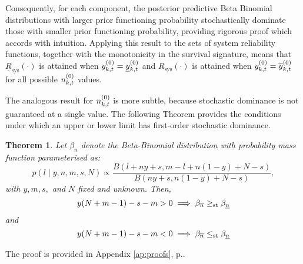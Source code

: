 \documentclass[12pt, a4paper]{elsarticle}
\newtheorem{theorem}{Theorem}
\newcommand{\ul}[1]{\underline{#1}}
\newcommand{\ol}[1]{\overline{#1}}
\newcommand{\lRsys}{\ul{R}_\text{sys}}
\newcommand{\uRsys}{\ol{R}_\text{sys}}
\begin{document}
Consequently, for each component, the posterior predictive Beta Binomial distributions 
with larger prior functioning probability stochastically dominate those
with smaller prior functioning probability, providing rigorous proof 
which accords with intuition. Applying this result to the sets of system reliability 
functions, together with the monotonicity in the survival signature, means that
$\lRsys(\cdot)$ is attained when $\yktz = \yktzl$ and $\uRsys(\cdot)$
is attained when $\yktz = \yktzu$ for all possible $n^{(0)}_{k,t}$ values.

The analogous result for $n^{(0)}_{k,t}$ is more subtle, because stochastic 
dominance is not guaranteed at a single value.  The following Theorem 
provides the conditions under which an upper or lower limit has first-order stochastic dominance.

\begin{theorem}
  \label{thm:n}
  Let $\beta_n$ denote the Beta-Binomial distribution with probability mass function parameterised as:
  \[ p(l \mid y, n, m, s, N) \propto \frac{B(l + ny + s, m - l + n(1-y) + N - s)}{B(ny + s, n(1-y) + N - s)}, \]
  with $y, m, s,$ and $N$ fixed and unknown.  
  Then,
  \[ y(N+m-1)-s-m > 0 \implies \beta_{\nu} \ge_{\mathrm{st}} \beta_{\nl} \]
  and 
  \[ y(N+m-1)-s-m < 0 \implies \beta_{\nu} \le_{\mathrm{st}} \beta_{\nl} \]
\end{theorem}
The proof is provided in Appendix \ref{ap:proofs}, p.\pageref{prf:n}.
\end{document}
